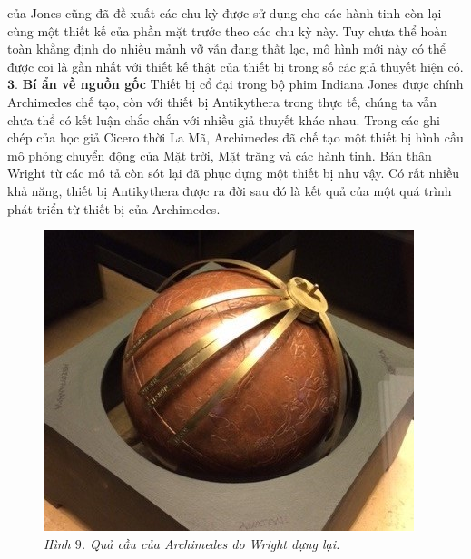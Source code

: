 	\begin{multicols}{2}
	của Jones cũng đã đề xuất các chu kỳ được sử dụng cho các hành tinh còn lại cùng một thiết kế của phần mặt trước theo các chu kỳ này. Tuy chưa thể hoàn toàn khẳng định do nhiều mảnh vỡ vẫn đang thất lạc, mô hình mới này có thể được coi là gần nhất với thiết kế thật của thiết bị trong số các giả thuyết hiện có. 
	\vskip 0.1cm
	$\pmb{3.}$ \textbf{\color{lichsutoanhoc}Bí ẩn về nguồn gốc}
	\vskip 0.1cm
	Thiết bị cổ đại trong bộ phim Indiana Jones được chính Archimedes chế tạo, còn với thiết bị Antikythera trong thực tế, chúng ta vẫn chưa thể có kết luận chắc chắn với nhiều giả thuyết khác nhau. Trong các ghi chép của học giả Cicero thời La Mã, Archimedes đã chế tạo một thiết bị hình cầu mô phỏng chuyển động của Mặt trời, Mặt trăng và các hành tinh. Bản thân Wright từ các mô tả còn sót lại đã phục dựng một thiết bị như vậy. Có rất nhiều khả năng, thiết bị Antikythera được ra đời sau đó là kết quả của một quá trình phát triển từ thiết bị của Archimedes.
	\begin{figure}[H]
		\vspace*{-5pt}
		\centering
		\captionsetup{labelformat= empty, justification=centering}
		\includegraphics[width= 1\linewidth]{10}
		\caption{\small\textit{\color{lichsutoanhoc}Hình $9$. Quả cầu của Archimedes do Wright dựng lại.}}
		\vspace*{-5pt}
	\end{figure}
	\vskip 0.1cm
	\begin{figure}

\end{figure}
\end{multicols}
